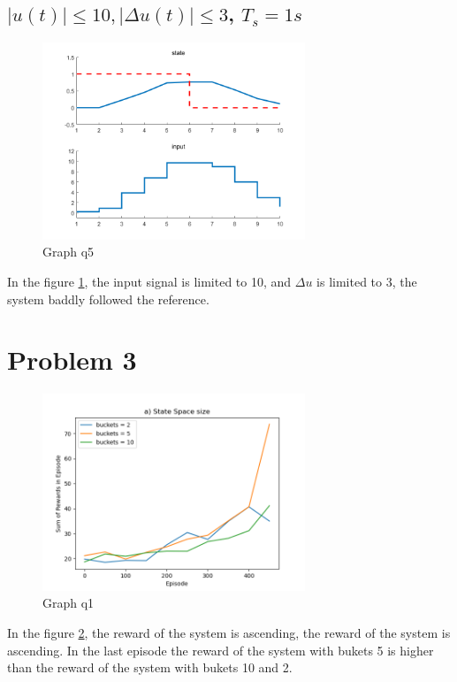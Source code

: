 \documentclass{article}
\begin{document}
\subsection{$\left| u(t)\right| \leq 10, \left| \Delta u(t) \right| \leq 3$, $T_s=1s$}

\begin{figure}[h!]
    \centering
    \includegraphics[width=0.7\textwidth]{pb1 4.png}
    \caption{Graph q5}\label{fig:pb2graph5}
\end{figure}
In the figure \ref{fig:pb2graph5}, the input signal is limited to 10,
and $\Delta u$ is limited to 3, the system baddly followed the reference.

\newpage
\section{Problem 3}
\begin{figure}[h!]
    \centering
    \includegraphics[width=0.7\textwidth]{graph a.png}
    \caption{Graph q1}\label{fig:pb3graph1}
\end{figure}
In the figure \ref{fig:pb3graph1}, the reward of the system is ascending,
the reward of the system is ascending. In the last episode the reward of
the system with bukets 5 is higher than the reward of the system with
bukets 10 and 2.
\end{document}
